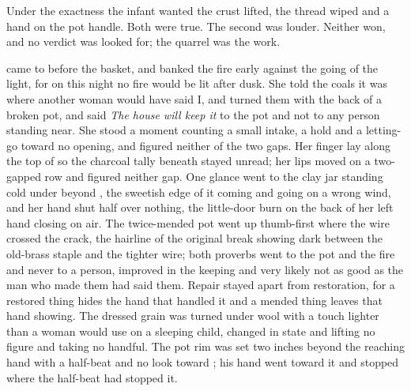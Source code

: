 Under the exactness the infant wanted the crust lifted, the thread wiped and a hand on the pot handle. Both were true. The second was louder. Neither won, and no verdict was looked for; the quarrel was the work.

 came to  before the basket, and banked the fire early against the going of the light, for on this night no fire would be lit after dusk. She told the coals it was  where another woman would have said I, and turned them with the back of a broken pot, and said \emph{The house will keep it} to the pot and not to any person standing near. She stood a moment counting a small intake, a hold and a letting-go toward no opening, and figured neither of the two gaps. Her finger lay along the top of  so the charcoal tally beneath stayed unread; her lips moved on a two-gapped row and figured neither gap. One glance went to the clay jar standing cold under  beyond , the sweetish edge of it coming and going on a wrong wind, and her hand shut half over nothing, the little-door burn on the back of her left hand closing on air. The twice-mended pot went up thumb-first where the wire crossed the crack, the hairline of the original break showing dark between the old-brass staple and the tighter wire; both proverbs went to the pot and the fire and never to a person, improved in the keeping and very likely not as good as the man who made them had said them. Repair stayed apart from restoration, for a restored thing hides the hand that handled it and a mended thing leaves that hand showing. The dressed grain was turned under wool with a touch lighter than a woman would use on a sleeping child, changed in state and lifting no figure and taking no handful. The pot rim was set two inches beyond the reaching hand with a half-beat and no look toward ; his hand went toward it and stopped where the half-beat had stopped it.

